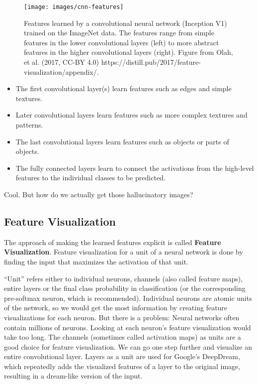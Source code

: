 \documentclass[
  10pt,
]{scrbook}
\providecommand{\tightlist}{%
  \setlength{\itemsep}{0pt}\setlength{\parskip}{0pt}}
\begin{document}
\begin{figure}

{\centering \texttt{[image: images/cnn-features]} 

}

\caption{Features learned by a convolutional neural network (Inception V1) trained on the ImageNet data. The features range from simple features in the lower convolutional layers (left) to more abstract features in the higher convolutional layers (right). Figure from Olah, et al. (2017, CC-BY 4.0) https://distill.pub/2017/feature-visualization/appendix/.}\label{fig:unnamed-chunk-53}
\end{figure}

\begin{itemize}
\tightlist
\item
  The first convolutional layer(s) learn features such as edges and simple textures.
\item
  Later convolutional layers learn features such as more complex textures and patterns.
\item
  The last convolutional layers learn features such as objects or parts of objects.
\item
  The fully connected layers learn to connect the activations from the high-level features to the individual classes to be predicted.
\end{itemize}

Cool.
But how do we actually get those hallucinatory images?

\hypertarget{feature-visualization}{%
\subsection{Feature Visualization}\label{feature-visualization}}

The approach of making the learned features explicit is called \textbf{Feature Visualization}.
Feature visualization for a unit of a neural network is done by finding the input that maximizes the activation of that unit.

``Unit'' refers either to individual neurons, channels (also called feature maps), entire layers or the final class probability in classification (or the corresponding pre-softmax neuron, which is recommended).
Individual neurons are atomic units of the network, so we would get the most information by creating feature visualizations for each neuron.
But there is a problem:
Neural networks often contain millions of neurons.
Looking at each neuron's feature visualization would take too long.
The channels (sometimes called activation maps) as units are a good choice for feature visualization.
We can go one step further and visualize an entire convolutional layer.
Layers as a unit are used for Google's DeepDream, which repeatedly adds the visualized features of a layer to the original image, resulting in a dream-like version of the input.
\end{document}
